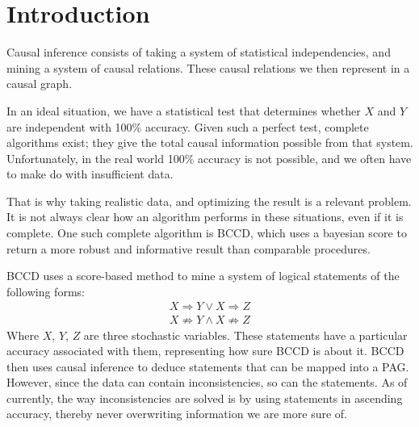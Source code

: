 \documentclass[11pt,a4paper]{report}
\begin{document}
\tableofcontents

\chapter{Introduction}\label{introduction}
Causal inference consists of taking a system of statistical
independencies, and mining a system of causal relations. These causal
relations we then represent in a causal graph.

In an ideal situation, we have a statistical test that determines
whether $X$ and $Y$ are independent with 100\% accuracy. Given such a
perfect test, complete algorithms exist; they give the total causal
information possible from that system. Unfortunately, in the real world
100\% accuracy is not possible, and we often have to make do with
insufficient data.

That is why taking realistic data, and optimizing the result is a relevant
problem. It is not always clear how an algorithm performs in these
situations, even if it is complete. One such complete algorithm is
BCCD\cite{claassenBayesianApproachConstraint2012}, which uses a bayesian
score to return a more robust and informative result than comparable
procedures.

BCCD uses a score-based method to mine a system of logical statements of
the following forms:
\begin{align*}
  X \Rightarrow Y \lor X \Rightarrow Z \\
  X \not \Rightarrow Y \land X \not \Rightarrow Z
\end{align*}
Where $X$, $Y$, $Z$ are three stochastic variables. These statements have
a particular accuracy associated with them, representing how sure BCCD is
about it. BCCD then uses causal inference to deduce statements that can be
mapped into a PAG. However, since the data can contain inconsistencies, so
can the statements. As of currently, the way inconsistencies are solved is
by using statements in ascending accuracy, thereby never overwriting
information we are more sure of.
\end{document}

